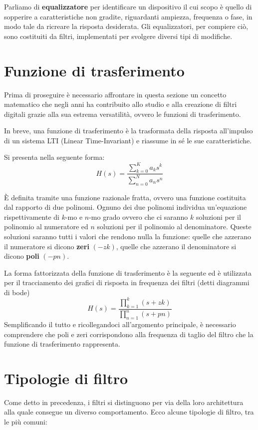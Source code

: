 Parliamo di \textbf{equalizzatore} per identificare un dispositivo il cui scopo è quello di sopperire a caratteristiche non gradite, riguardanti ampiezza, frequenza o fase, in modo tale da ricreare la risposta desiderata. Gli equalizzatori, per compiere ciò, sono costituiti da filtri, implementati per svolgere diversi tipi di modifiche.

\section{Funzione di trasferimento}
Prima di proseguire è necessario affrontare in questa sezione un concetto matematico che negli anni ha contribuito allo studio e alla creazione di filtri digitali grazie alla sua estrema versatilità, ovvero le funzioni di trasferimento.

In breve, una funzione di trasferimento è la trasformata della risposta all’impulso di un sistema LTI (Linear Time-Invariant) e riassume in sé le sue caratteristiche.

Si presenta nella seguente forma:
\begin{equation}
H(s)=\frac{\sum_{k=0}^K a_k s^k}{\sum_{n=0}^N a_n s^n}
\end{equation}

È definita tramite una funzione razionale fratta, ovvero una funzione costituita dal rapporto di due polinomi. Ognuno dei due polinomi individua un’equazione rispettivamente di $k$-mo e $n$-mo grado ovvero che ci saranno $k$ soluzioni per il polinomio al numeratore ed $n$ soluzioni per il polinomio al denominatore. Queste soluzioni saranno tutti i valori che rendono nulla la funzione: quelle che azzerano il numeratore si dicono \textbf{zeri} $(-zk)$, quelle che azzerano il denominatore si dicono \textbf{poli} $(-pn)$.

La forma fattorizzata della funzione di trasferimento è la seguente ed è utilizzata per il tracciamento dei grafici di risposta in frequenza dei filtri (detti diagrammi di bode)
\begin{equation}
H(s)=\frac{\prod_{k=1}^k (s+zk)}{\prod_{n=1}^n (s+pn)}
\end{equation}
\bigskip
Semplificando il tutto e ricollegandoci all’argomento principale, è necessario comprendere che poli e zeri corrispondono alla frequenza di taglio del filtro che la funzione di trasferimento rappresenta.
\section{Tipologie di filtro}
Come detto in precedenza, i filtri si distinguono per via della loro architettura alla quale consegue un diverso comportamento. Ecco alcune tipologie di filtro, tra le più comuni:

